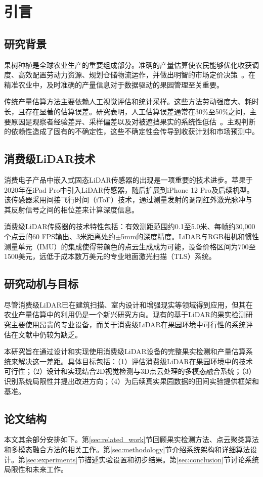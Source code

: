 \section{引言}

\subsection{研究背景}
果树种植是全球农业生产的重要组成部分。准确的产量估算使农民能够优化收获调度、高效配置劳动力资源、规划仓储物流运作，并做出明智的市场定价决策~\citep{Maheswari_2021}。在精准农业中，及时准确的产量信息对于数据驱动的果园管理至关重要。

传统产量估算方法主要依赖人工视觉评估和统计采样。这些方法劳动强度大、耗时长，且存在显著的估算误差。研究表明，人工估算误差通常在30\%至50\%之间，主要原因是观察者经验差异、采样偏差以及对被遮挡果实的系统性低估~\citep{Sa_2016}。主观判断的依赖性造成了固有的不确定性，这些不确定性会传导到收获计划和市场预测中。

\subsection{消费级LiDAR技术}
消费电子产品中嵌入式固态LiDAR传感器的出现是一项重要的技术进步。苹果于2020年在iPad Pro中引入LiDAR传感器，随后扩展到iPhone 12 Pro及后续机型。该传感器采用间接飞行时间（iToF）技术，通过测量发射的调制红外激光脉冲与其反射信号之间的相位差来计算深度信息。

消费级LiDAR传感器的技术特性包括：有效测距范围约0.1至5.0米、每帧约30,000个点云的60 FPS输出、3米距离处约$\pm$5mm的深度精度。LiDAR与RGB相机和惯性测量单元（IMU）的集成使得带颜色的点云生成成为可能，设备价格区间为700至1500美元，远低于成本数万美元的专业地面激光扫描（TLS）系统。

\subsection{研究动机与目标}
尽管消费级LiDAR已在建筑扫描、室内设计和增强现实等领域得到应用，但其在农业产量估算中的利用仍是一个新兴研究方向。现有的基于LiDAR的果实检测研究主要使用昂贵的专业设备，而关于消费级LiDAR在果园环境中可行性的系统评估在文献中仍较为缺乏。

本研究旨在通过设计和实现使用消费级LiDAR设备的完整果实检测和产量估算系统来解决这一差距。具体目标包括：（1）评估消费级LiDAR在果园环境中的技术可行性；（2）设计和实现结合2D视觉检测与3D点云处理的多模态融合系统；（3）识别系统局限性并提出改进方向；（4）为后续真实果园数据的田间实验提供框架和基准。

\subsection{论文结构}
本文其余部分安排如下。第\ref{sec:related_work}节回顾果实检测方法、点云聚类算法和多模态融合方法的相关工作。第\ref{sec:methodology}节介绍系统架构和详细算法设计。第\ref{sec:experiments}节描述实验设置和初步结果。第\ref{sec:conclusion}节讨论系统局限性和未来工作。